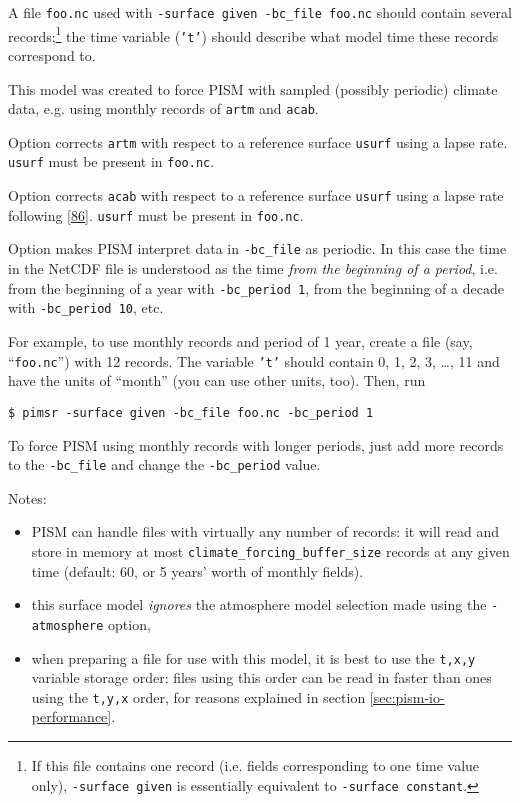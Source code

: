 \begin{itemize}
    A file \texttt{foo.nc} used with \texttt{-surface given -bc_file foo.nc} should contain several records;\footnote{If this file contains one record (i.e. fields corresponding to one time value only), \texttt{-surface given} is essentially equivalent to \texttt{-surface constant}.} the time variable (\texttt{'t'}) should describe what model time these records correspond to.

    This model was created to force PISM with sampled (possibly periodic) climate data, e.g. using monthly records of \texttt{artm} and \texttt{acab}.

 Option  corrects \texttt{artm} with respect to a reference surface \texttt{usurf} using a lapse rate. \texttt{usurf} must be present in \texttt{foo.nc}.

 Option  corrects \texttt{acab} with respect to a reference surface \texttt{usurf} using a lapse rate following [\href{http://www.truenuff.tv/glacierrace.php}{86}]. \texttt{usurf} must be present in \texttt{foo.nc}.

Option  makes PISM interpret data in \texttt{-bc_file} as periodic. In this case the time in the NetCDF file is understood as the time \emph{from the beginning of a period}, i.e. from the beginning of a year with \texttt{-bc_period 1}, from the beginning of a decade with \texttt{-bc_period 10}, etc.

For example, to use monthly records and period of 1 year, create a file (say, ``\texttt{foo.nc}'') with 12 records. The variable \texttt{'t'} should contain 0, 1, 2, 3, \dots, 11 and have the units of ``month'' (you can use other units, too). Then, run
\begin{verbatim}
$ pimsr -surface given -bc_file foo.nc -bc_period 1
\end{verbatim}%

To force PISM using monthly records with longer periods, just add more records to the \texttt{-bc_file}  and change the \texttt{-bc_period} value.

\noindent Notes:
\begin{itemize}
\item PISM can handle files with virtually any number of records: it will
  read and store in memory at most \texttt{climate_forcing_buffer_size} records
  at any given time (default: 60, or 5 years' worth of monthly fields).
\item this surface model \emph{ignores} the atmosphere model selection made
  using the \texttt{-atmosphere} option,
\item when preparing a file for use with this model, it is best to use the \texttt{t,x,y} variable storage order: files using this order can be read in faster than ones using the \texttt{t,y,x} order, for reasons explained in section \ref{sec:pism-io-performance}.


\end{itemize}
\end{itemize}
